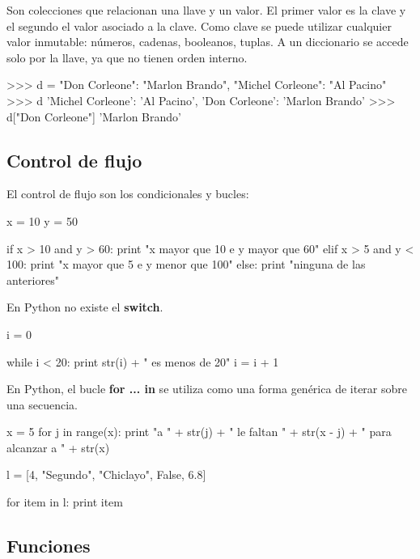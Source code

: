 Son colecciones que relacionan una llave y un valor. El primer valor es la clave y el segundo el valor asociado a la clave. Como clave se puede utilizar cualquier valor inmutable: números, cadenas, booleanos, tuplas. A un diccionario se accede solo por la llave, ya que no tienen orden interno.\\

\begin{pyglist}[language=python]
>>> d = {"Don Corleone": "Marlon Brando", "Michel Corleone": "Al Pacino"}
>>> d
{'Michel Corleone': 'Al Pacino', 'Don Corleone': 'Marlon Brando'}
>>> d["Don Corleone"]
'Marlon Brando'
\end{pyglist}

\subsection{Control de flujo}

El control de flujo son los condicionales y bucles:\\

\begin{pyglist}
x = 10
y = 50

if x > 10 and y > 60:
    print "x mayor que 10 e y mayor que 60"
elif x > 5 and y < 100:
    print "x mayor que 5 e y menor que 100"
else:
    print "ninguna de las anteriores"
\end{pyglist}

En Python no existe el \textbf{switch}.\\

\begin{pyglist}
i = 0

while i < 20:
    print str(i) + " es menos de 20"
    i = i + 1
\end{pyglist}


En Python, el bucle \textbf{for ... in} se utiliza como una forma genérica de iterar sobre una secuencia.\\

\begin{pyglist}
x = 5
for j in range(x):
    print "a " + str(j) + " le faltan " + str(x - j) + " para alcanzar a " + str(x)
    
l = [4, "Segundo", "Chiclayo", False, 6.8]

for item in l:
    print item
\end{pyglist}

\subsection{Funciones}

